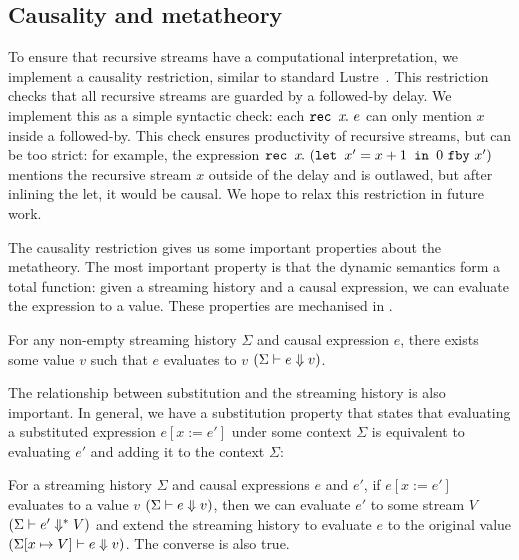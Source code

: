 \documentclass[a4paper,UKenglish,cleveref, autoref, thm-restate,anonymous]{lipics-v2021}
\begin{document}
\subsection{Causality and metatheory}
\label{s:core:causality}

To ensure that recursive streams have a computational interpretation, we implement a causality restriction, similar to standard Lustre~\cite{caspi1995functional}.
This restriction checks that all recursive streams are guarded by a followed-by delay.
We implement this as a simple syntactic check: each $\texttt{rec~} x\hspace{-0.1em}.~e$ can only mention $x$ inside a followed-by.
This check ensures productivity of recursive streams, but can be too strict: for example, the expression $\texttt{rec~} x\hspace{-0.1em}.~(\texttt{let~} x' = x + 1 \texttt{~in~} 0~\texttt{fby}~x')$ mentions the recursive stream $x$ outside of the delay and is outlawed, but after inlining the let, it would be causal.
We hope to relax this restriction in future work.

The causality restriction gives us some important properties about the metatheory.
The most important property is that the dynamic semantics form a total function: given a streaming history and a causal expression, we can evaluate the expression to a value.
These properties are mechanised in \fstar{}.



\begin{theorem}
  For any non-empty streaming history $\Sigma$ and causal expression $e$, there exists some value $v$ such that $e$ evaluates to $v$ $(\Sigma \vdash e \Downarrow v)$.
\end{theorem}

The relationship between substitution and the streaming history is also important.
In general, we have a substitution property that states that evaluating a substituted expression $e[x := e']$ under some context $\Sigma$ is equivalent to evaluating $e'$ and adding it to the context $\Sigma$:

\begin{theorem}
  For a streaming history $\Sigma$ and causal expressions $e$ and $e'$, if $e[x := e']$ evaluates to a value $v$ $(\Sigma \vdash e \Downarrow v)$, then we can evaluate $e'$ to some stream $V$ $(\Sigma \vdash e' \Downarrow^{*} V)$ and extend the streaming history to evaluate $e$ to the original value $(\Sigma[x \mapsto V] \vdash e \Downarrow v)$.
  The converse is also true.
\end{theorem}
\end{document}
